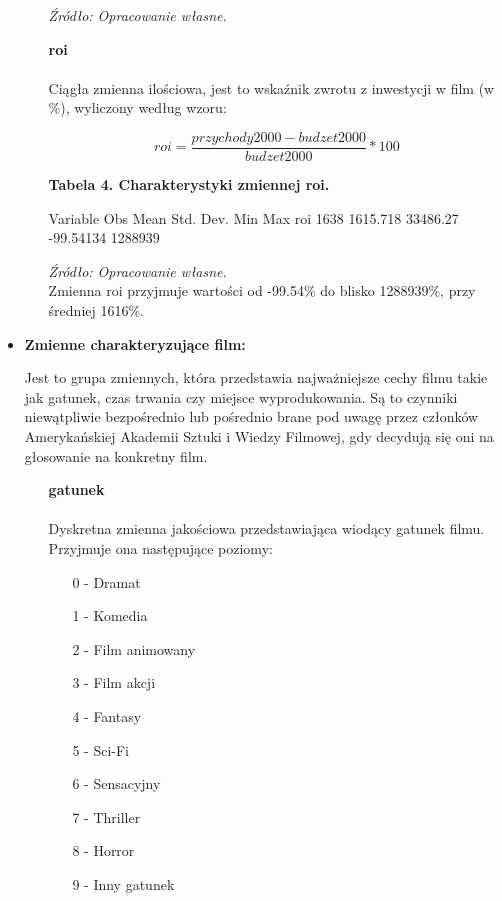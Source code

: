 \begin{itemize}
\begin{itemize}
\textit{\footnotesize{Źródło: Opracowanie własne.}} \\
 	 
  	\item[\ding{228}]\textbf{roi}\\
  	\\Ciągła zmienna ilościowa, jest to wskaźnik zwrotu z inwestycji w film (w \%), wyliczony według wzoru:
  	
  	\begin{equation}
	roi=\frac{przychody2000-budzet2000}{budzet2000}*100
	\end{equation}
	
\vspace{0.5cm}
	
{\centering
\textbf{Tabela 4. Charakterystyki zmiennej roi.}}
\begin{stlog}	
	
    Variable {\VBAR}       Obs        Mean    Std. Dev.       Min        Max
         roi {\VBAR}      1638    1615.718    33486.27  -99.54134    1288939
{\smallskip}

\end{stlog}

\textit{\footnotesize{Źródło: Opracowanie własne.}} \\


Zmienna roi przyjmuje wartości od -99.54\% do blisko 1288939\%, przy średniej 1616\%.
  	
  	\end{itemize}

\vspace{0.5cm}
\item \textbf{\large{Zmienne charakteryzujące film:}}
\vspace{0.3cm}

	Jest to grupa zmiennych, która przedstawia najważniejsze cechy filmu takie jak gatunek, czas trwania czy miejsce wyprodukowania. Są to czynniki niewątpliwie bezpośrednio lub pośrednio brane pod uwagę przez członków Amerykańskiej Akademii Sztuki i Wiedzy Filmowej, gdy decydują się oni na głosowanie na konkretny film.

	\begin{itemize}
  	\item[\ding{228}]\textbf{gatunek} \\
  	\\Dyskretna zmienna jakościowa przedstawiająca wiodący gatunek filmu. Przyjmuje ona następujące poziomy:
  	\begin{itemize}
  	\item[0] - Dramat
  	\item[1] - Komedia
  	\item[2] - Film animowany
  	\item[3] - Film akcji
  	\item[4] - Fantasy
  	\item[5] - Sci-Fi
  	\item[6] - Sensacyjny
  	\item[7] - Thriller
  	\item[8] - Horror
  	\item[9] - Inny gatunek
  	\end{itemize}
  	

\end{itemize}
\end{itemize}
